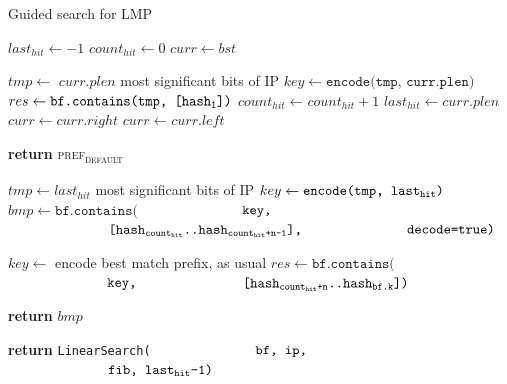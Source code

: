 \documentclass[conference,compsoc]{IEEEtran}
\begin{document}
\begin{algorithm}
  \caption{Guided search for LMP}\label{alg:guidedsearch}
  \begin{algorithmic}[1]

      \State $last_{hit} \gets -1$
      \State $count_{hit} \gets 0$
      \State $curr \gets bst$

        \State $tmp \gets$ $curr.plen$ most significant bits of IP
        \State $key \gets \texttt{encode(tmp, curr.plen)}$
        \State $res \gets \texttt{bf.contains(tmp, [hash\textsubscript{1}])}$
          \State $count_{hit} \gets count_{hit} + 1$
          \State $last_{hit} \gets curr.plen$
          \State $curr \gets curr.right$
        \Else
          \State $curr \gets curr.left$
        \EndIf
      \EndWhile{}

        \State \textbf{return} \textsc{pref\textsubscript{default}}
      \EndIf

      \State $tmp \gets last_{hit}$ most significant bits of IP
      \State $key \gets \texttt{encode(tmp, last\textsubscript{hit})}$
      \State $bmp \gets \texttt{bf.contains(}$
              \State $\hspace*{25mm} \texttt{key,}$
              \State $\hspace*{25mm} \texttt{[hash\textsubscript{count\textsubscript{hit}}..hash\textsubscript{count\textsubscript{hit}+n-1}],}$
              \State $\hspace*{25mm} \texttt{decode=true)}$

        \State $key \gets$ encode best match prefix, as usual
        \State $res \gets \texttt{bf.contains(}$
              \State $\hspace*{25mm} \texttt{key,}$
              \State $\hspace*{25mm} \texttt{[hash\textsubscript{count\textsubscript{hit}+n}..hash\textsubscript{bf.k}])}$

            \State \textbf{return} $bmp$
        \EndIf
      \EndIf

      \State \textbf{return} \texttt{LinearSearch(}
      \State $\hspace*{25mm} \texttt{bf, ip,}$
      \State $\hspace*{25mm} \texttt{fib, last\textsubscript{hit}-1)}$
    \EndProcedure

  \end{algorithmic}
\end{algorithm}
\end{document}
